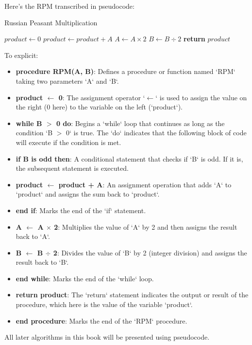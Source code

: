 \documentclass[
	12pt, %
	fleqn, %
	a4paper, %
]{LegrandOrangeBook}
\begin{document}
Here's the RPM transcribed in pseudocode:
\begin{algorithm}[H]
	\caption{Russian Peasant Multiplication}\label{alg:rpm}
	\begin{algorithmic}[1]
		\State $product \gets 0$
				\State $product \gets product + A$
			\EndIf
			\State $A \gets A \times 2$
			\State $B \gets B \div 2$
		\EndWhile
		\State \textbf{return} $product$
	\EndProcedure
	\end{algorithmic}
	\end{algorithm}

    To explicit:
    \begin{itemize}
        \item \textbf{procedure RPM(A, B)}: Defines a procedure or function named `RPM` taking two parameters `A` and `B`.
        \item \textbf{product $\leftarrow$ 0}: The assignment operator `$\leftarrow$` is used to assign the value on the right (0 here) to the variable on the left (`product`).
        \item \textbf{while B $>$ 0 do}: Begins a `while` loop that continues as long as the condition `B $>$ 0` is true. The `do` indicates that the following block of code will execute if the condition is met.
        \item \textbf{if B is odd then}: A conditional statement that checks if `B` is odd. If it is, the subsequent statement is executed.
        \item \textbf{product $\leftarrow$ product + A}: An assignment operation that adds `A` to `product` and assigns the sum back to `product`.
        \item \textbf{end if}: Marks the end of the `if` statement.
        \item \textbf{A $\leftarrow$ A $\times$ 2}: Multiplies the value of `A` by 2 and then assigns the result back to `A`.
        \item \textbf{B $\leftarrow$ B $\div$ 2}: Divides the value of `B` by 2 (integer division) and assigns the result back to `B`.
        \item \textbf{end while}: Marks the end of the `while` loop.
        \item \textbf{return product}: The `return` statement indicates the output or result of the procedure, which here is the value of the variable `product`.
        \item \textbf{end procedure}: Marks the end of the `RPM` procedure.
    \end{itemize}
	All later algorithms in this book will be presented using pseudocode.
\end{document}
